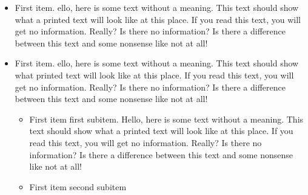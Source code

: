 \documentclass[a4paper,14pt]{extarticle}
\begin{document}
    \begin{itemize}
        \item First item. ello, here is some text without a meaning.  This text should show what 
              a printed text will look like at this place.  If you read this text, 
              you will get no information.  Really?  Is there no information?  Is there 
              a difference between this text and some nonsense like not at all!
        \item First item. ello, here is some text without a meaning.  This text should show what 
               printed text will look like at this place.  If you read this text, 
              you will get no information.  Really?  Is there no information?  Is there 
              a difference between this text and some nonsense like not at all!
        \begin{itemize}
            \item First item first subitem. Hello, here is some text without a meaning.  This text should show what 
                  a printed text will look like at this place.  If you read this text, 
                  you will get no information.  Really?  Is there no information?  Is there 
                  a difference between this text and some nonsense like not at all!
            \item First item second subitem            
        \end{itemize}
    \end{itemize}
\end{document}
